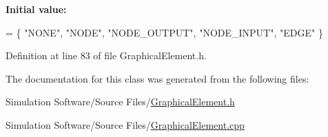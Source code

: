 {\bfseries Initial value\+:}
\begin{DoxyCode}
= \{
    \textcolor{stringliteral}{"NONE"},
    \textcolor{stringliteral}{"NODE"},
    \textcolor{stringliteral}{"NODE\_OUTPUT"},
    \textcolor{stringliteral}{"NODE\_INPUT"},
    \textcolor{stringliteral}{"EDGE"}
\}
\end{DoxyCode}


Definition at line 83 of file Graphical\+Element.\+h.



The documentation for this class was generated from the following files\+:\begin{DoxyCompactItemize}
\item 
Simulation Software/\+Source Files/\hyperlink{_graphical_element_8h}{Graphical\+Element.\+h}\item 
Simulation Software/\+Source Files/\hyperlink{_graphical_element_8cpp}{Graphical\+Element.\+cpp}\end{DoxyCompactItemize}
